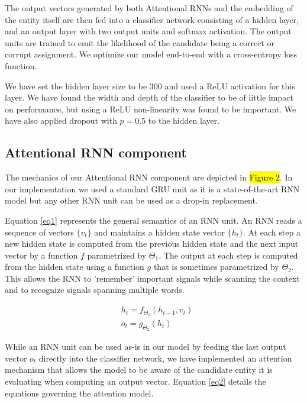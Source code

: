 \documentclass[11pt]{article}
\begin{document}
	The output vectors generated by both Attentional RNNs and the embedding of the entity itself are then fed into a classifier network consisting of a hidden layer, and an output layer with two output units and softmax activation. The output units are trained to emit the likelihood of the candidate being a correct or corrupt assignment. We optimize our model end-to-end with a cross-entropy loss function. 
	
	We have set the hidden layer size to be 300 and used a ReLU activation for this layer. We have found the width and depth of the classifier to be of little impact on performance, but using a ReLU non-linearity was found to be important. We have also applied dropout with $p=0.5$ to the hidden layer.
	
	\subsection{Attentional RNN component}
	
	The mechanics of our Attentional RNN component are depicted in \hl{Figure 2}. In our implementation we used a standard GRU unit \cite{cho2014learning} as it is a state-of-the-art RNN model but any other RNN unit can be used as a drop-in replacement. 
		
	Equation \ref{eq1} represents the general semantics of an RNN unit. An RNN reads a sequence of vectors $\{v_t\}$ and maintains a hidden state vector $\{h_t\}$. At each step a new hidden state is computed from the previous hidden state and the next input vector by a function $f$ parametrized by $\Theta_1$. The output at each step is computed from the hidden state using a function $g$ that is sometimes parametrized by $\Theta_2$. This allows the RNN to 'remember' important signals while scanning the context and to recognize signals spanning multiple words.
	
	\begin{equation}
	\label{eq1}
	\begin{aligned}
	& h_t=f_{\Theta_1}(h_{t-1}, v_t) \\
	& o_t=g_{\Theta_2}(h_t)
	\end{aligned}
	\end{equation}

	While an RNN unit can be used as-is in our model by feeding the last output vector $o_t$ directly into the classifier network, we have implemented an attention mechanism that allows the model to be aware of the candidate entity it is evaluating when computing an output vector. Equation \ref{eq2} details the equations governing the attention model.
	
\end{document}
